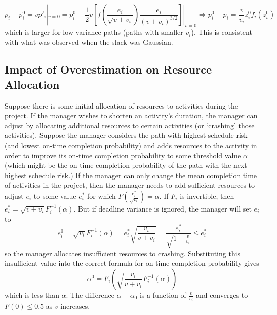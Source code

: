 \documentclass[11pt]{article}
\begin{document}
$$p_i -p^0_i= v p'_i |_{v=0} =p^0_i- \frac{1}{2} v [f(\frac{e_i}{\sqrt{v+v_i}}) \frac{e_i}{(v+v_i)^{3/2}}]|_{v=0}
\Longrightarrow
p^0_i-p_i = \frac{v}{v_i} z^0_i f_i(z^0_i)  $$
which is larger for low-variance paths (paths with smaller $v_i$).  This is consistent with what was observed when the slack was Gaussian. \subsection{Impact of Overestimation on Resource Allocation}
Suppose there is some initial allocation of resources to activities during the project.  If the manager wishes to shorten an activity's duration, the manager can adjust by allocating additional resources to certain activities (or `crashing' those activities). Suppose the manager considers the path with highest schedule risk (and lowest on-time completion probability) and adds resources to the activity in order to improve its on-time completion probability to some threshold value $\alpha$ (which might be the on-time completion probability of the path with the next highest schedule risk.)  If the manager can only change the mean completion time of activities in the project, then the manager needs to add sufficient resources to adjust $e_i$ to some value $e^*_i$ for which $F(\frac{e^*_i}{\sqrt{v_i}})=\alpha$. 
If $F_i$ is invertible, then $e^*_i=\sqrt{v+v_i} F^{-1}_i(\alpha)$.  But if deadline variance is ignored, the manager will set $e_i$ to $$e^0_i = \sqrt{v_i} F^{-1}_i (\alpha) = e^*_i \sqrt{\frac{v_i}{v+v_i}} 
= \frac{e^*_i}{\sqrt{1 + \frac{v}{v_i}}} \leq e^*_i  $$
so the manager allocates insufficient resources to crashing.  Substituting this insufficient value into the correct formula for on-time completion probability gives
$$\alpha^0=F_i(\sqrt{\frac{v_i}{v+v_i}} F^{-1}_i(\alpha)) $$
which is less than $\alpha$.   The difference $\alpha-\alpha_0$ is a function of $\frac{v}{v_i}$ and converges to $F(0) \leq 0.5$ as $v$ increases.  
\par
\end{document}
